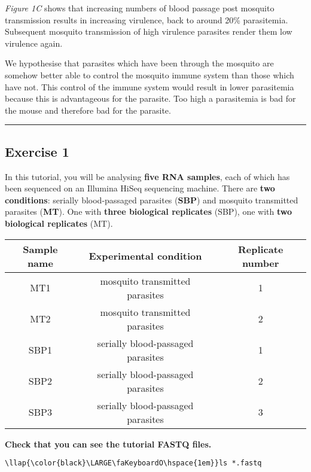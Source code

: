 \documentclass[11pt]{article}
\begin{document}
\textit{Figure 1C} shows that increasing numbers of blood passage post
mosquito transmission results in increasing virulence, back to around
20\% parasitemia. Subsequent mosquito transmission of high virulence
parasites render them low virulence again.

We hypothesise that parasites which have been through the mosquito are
somehow better able to control the mosquito immune system than those
which have not. This control of the immune system would result in lower
parasitemia because this is advantageous for the parasite. Too high a
parasitemia is bad for the mouse and therefore bad for the parasite.

    \begin{center}\rule{0.5\linewidth}{.4pt}\end{center}

    \hypertarget{exercise-1}{%
\subsection{Exercise 1}\label{exercise-1}}

    In this tutorial, you will be analysing \textbf{five RNA samples}, each
of which has been sequenced on an Illumina HiSeq sequencing machine.
There are \textbf{two conditions}: serially blood-passaged parasites
(\textbf{SBP}) and mosquito transmitted parasites (\textbf{MT}). One
with \textbf{three biological replicates} (SBP), one with \textbf{two
biological replicates} (MT).

    \begin{longtable}[]{@{}ccc@{}}
\hline
Sample name & Experimental condition & Replicate number\tabularnewline
\hline
\endhead
MT1 & mosquito transmitted parasites & 1\tabularnewline
MT2 & mosquito transmitted parasites & 2\tabularnewline
SBP1 & serially blood-passaged parasites & 1\tabularnewline
SBP2 & serially blood-passaged parasites & 2\tabularnewline
SBP3 & serially blood-passaged parasites & 3\tabularnewline
\hline
\end{longtable}

    \textbf{Check that you can see the tutorial FASTQ files.}





\begin{terminalinput}
\begin{Verbatim}[commandchars=\\\{\}]
\llap{\color{black}\LARGE\faKeyboardO\hspace{1em}}ls *.fastq
\end{Verbatim}
\end{terminalinput}
\end{document}
